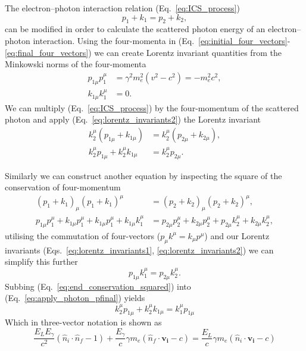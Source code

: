 \documentclass[../main.tex]{subfiles}
\begin{document}
The electron--photon interaction relation (Eq.~\ref{eq:ICS_process})
\begin{equation*}
p_{1} + k_{1} = p_{2} + k_{2},    
\end{equation*}
can be modified in order to calculate the scattered photon energy of an electron--photon interaction. Using the four-momenta in (Eq.~\ref{eq:initial_four_vectors}-\ref{eq:final_four_vectors}) we can create Lorentz invariant quantities from the Minkowski norms of the four-momenta 
\begin{align}
p_{1\mu}p_{1}^{\mu} &= \gamma^{2}m_{e}^{2}\left(v^{2}-c^{2}\right) = -m_{e}^{2}c^{2},
\label{eq:lorentz_invariants1} \\
k_{1\mu}k_{1}^{\mu} &= 0.
\label{eq:lorentz_invariants2}
\end{align}
We can multiply (Eq.~\ref{eq:ICS_process}) by the four-momentum  of the scattered photon and apply (Eq.~\ref{eq:lorentz_invariants2}) the Lorentz invariant 
\begin{align}
k_{2}^{\mu}\left(p_{1\mu} + k_{1\mu}\right) &= k_{2}^{\mu}\left(p_{2\mu} + k_{2\mu}\right), \nonumber\\
k_{2}^{\mu}p_{1\mu}+k_{2}^{\mu}k_{1\mu} &= k_{2}^{\mu}p_{2\mu}.
\label{eq:apply_photon_pfinal}
\end{align}

Similarly we can construct another equation by inspecting the square of the conservation of four-momentum
\begin{align}
\left(p_{1}+k_{1}\right)_{\mu}\left(p_{1}+k_{1}\right)^{\mu} &= \left(p_{2}+k_{2}\right)_{\mu}\left(p_{2}+k_{2}\right)^{\mu}, \nonumber \\
p_{1\mu}p_{1}^{\mu}+k_{1\mu}p_{1}^{\mu}+k_{1\mu}p_{1}^{\mu}+k_{1\mu}k_{1}^{\mu} &= p_{2\mu}p_{2}^{\mu}+k_{2\mu}p_{2}^{\mu}+p_{2\mu}k_{2}^{\mu}+k_{2\mu}k_{2}^{\mu},
\label{eq:apply_conservation_squared}
\end{align}
utilising the commutation of four-vectors ($p_{\mu}k^{\mu} = k_{\mu}p^{\mu}$) and our Lorentz invariants (Eqs.~\ref{eq:lorentz_invariants1}, \ref{eq:lorentz_invariants2}) we can simplify this further 
\begin{equation}
p_{1\mu}k_{1}^{\mu} = p_{2\mu}k_{2}^{\mu}.
\label{eq:end_conservation_squared}
\end{equation}
Subbing (Eq.~\ref{eq:end_conservation_squared}) into (Eq.~\ref{eq:apply_photon_pfinal}) yields
\begin{equation}
k_{2}^{\mu}p_{1\mu}+k_{2}^{\mu}k_{1\mu} = k_{1}^{\mu}p_{1\mu}
\label{eq:substitution_four_vector}
\end{equation}
Which in three-vector notation is shown as
\begin{equation}
\frac{E_{L}E_{\gamma}}{c^{2}}\left(\hat{n}_{i}\cdot\hat{n}_{f}-1\right)+\frac{E_{\gamma}}{c}\gamma m_{e}\left(\hat{n}_{f}\cdot \boldsymbol{v_{i}}-c\right) = \frac{E_{L}}{c}\gamma m_{e}\left(\hat{n}_{i}\cdot \boldsymbol{v_{i}} -c\right)
\label{eq:three_vector_solution}
\end{equation}
\end{document}
